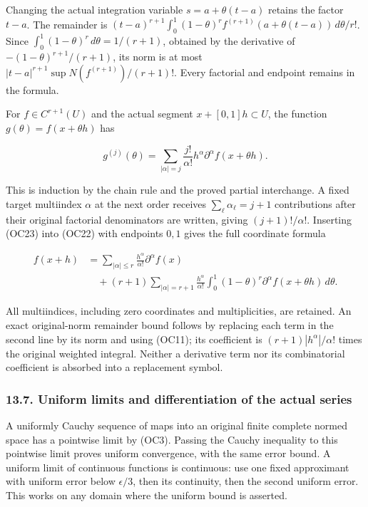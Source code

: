 \documentclass[
  11pt,
]{article}
\begin{document}
Changing the actual integration variable \(s=a+\theta(t-a)\) retains the
factor \(t-a\). The remainder is
\((t-a)^{r+1}\int_0^1(1-\theta)^r f^{(r+1)}(a+\theta(t-a))\,d\theta/r!\).
Since \(\int_0^1(1-\theta)^r\,d\theta=1/(r+1)\), obtained by the
derivative of \(-(1-\theta)^{r+1}/(r+1)\), its norm is at most
\(|t-a|^{r+1}\sup N(f^{(r+1)})/(r+1)!\). Every factorial and endpoint
remains in the formula.

For \(f\in C^{r+1}(U)\) and the actual segment \(x+[0,1]h\subset U\),
the function \(g(\theta)=f(x+\theta h)\) has

\[
 g^{(j)}(\theta)=
 \sum_{|\alpha|=j}\frac{j!}{\alpha!}h^\alpha
    \partial^\alpha f(x+\theta h).
\tag{OC23}
\]

This is induction by the chain rule and the proved partial interchange.
A fixed target multiindex \(\alpha\) at the next order receives
\(\sum_\ell\alpha_\ell= j+1\) contributions after their original
factorial denominators are written, giving \((j+1)!/\alpha!\). Inserting
(OC23) into (OC22) with endpoints \(0,1\) gives the full coordinate
formula

\[
 \begin{aligned}
 f(x+h)&=\sum_{|\alpha|\le r}\frac{h^\alpha}{\alpha!}\partial^\alpha f(x)\\
 &\quad +(r+1)\sum_{|\alpha|=r+1}\frac{h^\alpha}{\alpha!}
       \int_0^1(1-\theta)^r
            \partial^\alpha f(x+\theta h)\,d\theta.
 \end{aligned}\tag{OC24}
\]

All multiindices, including zero coordinates and multiplicities, are
retained. An exact original-norm remainder bound follows by replacing
each term in the second line by its norm and using (OC11); its
coefficient is \((r+1)|h^\alpha|/\alpha!\) times the original weighted
integral. Neither a derivative term nor its combinatorial coefficient is
absorbed into a replacement symbol.

\subsubsection{13.7. Uniform limits and differentiation of the actual
series}\label{uniform-limits-and-differentiation-of-the-actual-series}

A uniformly Cauchy sequence of maps into an original finite complete
normed space has a pointwise limit by (OC3). Passing the Cauchy
inequality to this pointwise limit proves uniform convergence, with the
same error bound. A uniform limit of continuous functions is continuous:
use one fixed approximant with uniform error below \(\epsilon/3\), then
its continuity, then the second uniform error. This works on any domain
where the uniform bound is asserted.
\end{document}
